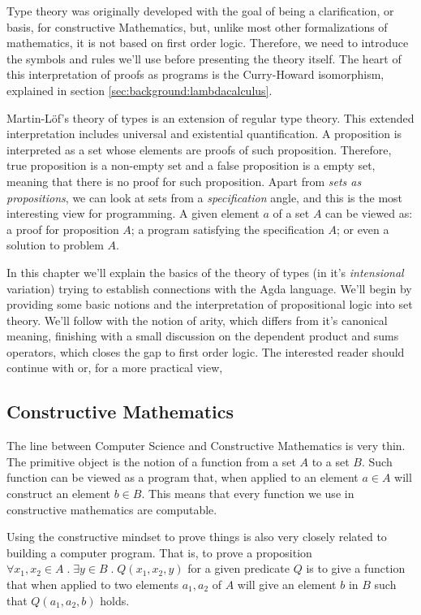 Type theory was originally developed with the goal of being a clarification, or basis,
for constructive Mathematics, but, unlike most other formalizations of mathematics, it is
not based on first order logic. Therefore, we need to introduce the symbols and
rules we'll use before presenting the theory itself. The heart of this interpretation of
proofs as programs is the Curry-Howard isomorphism, explained in section \ref{sec:background:lambdacalculus}.

Martin-L\"{o}f's theory of types \cite{lof84} is an extension of regular type theory. This extended
interpretation includes universal and existential quantification. 
A proposition is interpreted as a set whose elements
are proofs of such proposition. Therefore, true proposition is a non-empty set and a false proposition
is a empty set, meaning that there is no proof for such proposition. Apart from \emph{sets as propositions},
we can look at sets from a \emph{specification} angle, and this is the most interesting view for programming.
A given element $a$ of a set $A$ can be viewed as: a proof for proposition $A$; a program satisfying the
specification $A$; or even a solution to problem $A$.

In this chapter we'll explain the basics of the theory of types (in it's \emph{intensional} variation)
trying to establish connections with the Agda language. We'll begin by providing some basic notions
and the interpretation of propositional logic into set theory. We'll follow with the notion of arity,
which differs from it's canonical meaning, finishing with a small discussion on the dependent product
and sums operators, which closes the gap to first order logic. The interested reader should continue
with \cite{nords90} or, for a more practical view, \cite{wouter08,bove2009}

\subsection{Constructive Mathematics}
\label{subsec:martinlof:constructivemathematics}

The line between Computer Science and Constructive Mathematics is very thin. The primitive object is
the notion of a function from a set $A$ to a set $B$. Such function can be viewed as a program that,
when applied to an element $a \in A$ will construct an element $b \in B$. This means that every
function we use in constructive mathematics are computable. 

Using the constructive mindset to prove things is also very closely related to building a computer program.
That is, to prove a proposition $\forall x_1,x_2 \in A \; . \; \exists y \in B \; . \; Q(x_1, x_2, y)$ for a given
predicate $Q$ is to give a function that when applied to two elements $a_1, a_2$ of $A$ will give an element $b$ in $B$
such that $Q(a_1, a_2, b)$ holds. 

